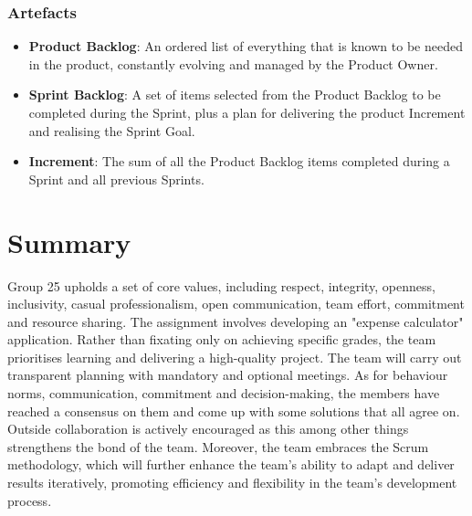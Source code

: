 \documentclass[sigconf,nonacm]{acmart}
\begin{document}
\subsubsection{Artefacts}
\begin{itemize}
    \item \textbf{Product Backlog}: An ordered list of everything that is known to be needed in the product, constantly evolving and managed by the Product Owner.
    \item \textbf{Sprint Backlog}: A set of items selected from the Product Backlog to be completed during the Sprint, plus a plan for delivering the product Increment and realising the Sprint Goal.
    \item \textbf{Increment}: The sum of all the Product Backlog items completed during a Sprint and all previous Sprints.
\end{itemize}


\section{Summary}
Group 25 upholds a set of core values, including respect, integrity, openness, inclusivity, casual professionalism, open communication, team effort, commitment and resource sharing. The assignment involves developing an "expense calculator" application. Rather than fixating only on achieving specific grades, the team prioritises learning and delivering a high-quality project. The team will carry out transparent planning with mandatory and optional meetings. As for behaviour norms, communication, commitment and decision-making, the members have reached a consensus on them and come up with some solutions that all agree on. Outside collaboration is actively encouraged as this among other things strengthens the bond of the team. Moreover, the team embraces the Scrum methodology, which will further enhance the team's ability to adapt and deliver results iteratively, promoting efficiency and flexibility in the team's development process.
\end{document}
